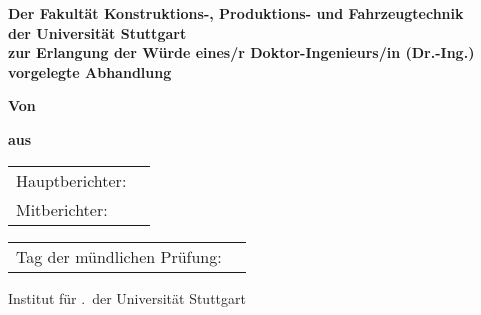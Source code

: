 \else %

\begin{titlepage}
	\centering
	\large
	
	\begin{Large}
		\textbf{\Titel}
	\end{Large}

	\vspace{2\baselineskip}

	\textbf{Der Fakultät Konstruktions-, Produktions- und Fahrzeugtechnik\\der Universität Stuttgart\\zur Erlangung der Würde eines/r Doktor-Ingenieurs/in (Dr.-Ing.)\\vorgelegte Abhandlung}

	\vspace{3\baselineskip}
	
	\textbf{Von}
	
	\vspace{0.8\baselineskip}

	\textbf{\Autor}

	\vspace{0.3\baselineskip}
	\textbf{aus \Geburtsort}
	
	\vspace{3\baselineskip}
	\begin{table}[H]
		\large
		\begin{tabular}{ll}
			\quad Hauptberichter: & \protect\Hauptberichter\\
			\quad Mitberichter: & \protect\Mitberichter\\
		\end{tabular}
	\end{table}
	\vspace{0.25\baselineskip}
	\begin{table}[H]
		\large
		\begin{tabular}{ll}
			\quad Tag der mündlichen Prüfung:  & \protect\Pruefungsdatum\\
		\end{tabular}
	\end{table}
	
	\vfill
	
	\begin{center}
		Institut für \Institut.\ der Universität Stuttgart
	\end{center}


	\Jahr	
\end{titlepage}

\fi %